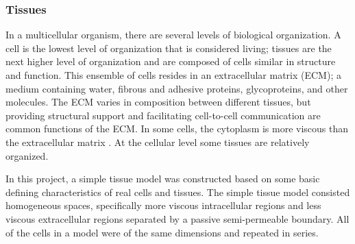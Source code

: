 	

\subsubsection{Tissues}
	In a multicellular organism, there are several levels of biological organization. A cell is the lowest level of organization that is considered living; tissues are the next higher level of organization and are composed of cells similar in structure and function. This ensemble of cells resides in an extracellular matrix (ECM); a medium containing water, fibrous and adhesive proteins, glycoproteins, and other molecules. The ECM varies in composition between different tissues, but providing structural support and facilitating cell-to-cell communication are common functions of the ECM. In some cells, the cytoplasm is more viscous than the extracellular matrix \citep{cr-biology}. At the cellular level some tissues are relatively organized.
	
	In this project, a simple tissue model was constructed based on some basic defining characteristics of real cells and tissues. The simple tissue model consisted homogeneous spaces, specifically more viscous intracellular regions and less viscous extracellular regions separated by a passive semi-permeable boundary. All of the cells in a model were of the same dimensions and repeated in series.











